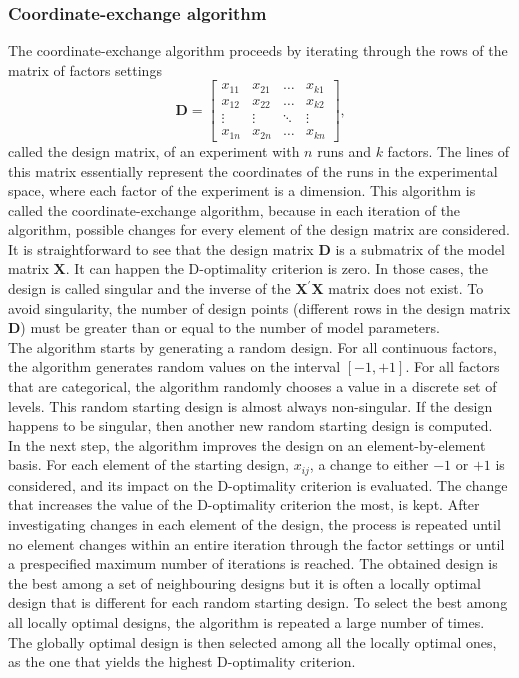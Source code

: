 \subsubsection{Coordinate-exchange algorithm}
The coordinate-exchange algorithm proceeds by iterating through the rows of the matrix of factors settings
\begin{equation}
\mathbf{D}= 
    \begin{bmatrix}
        x_{11} & x_{21} & \ldots & x_{k1} \\
        x_{12} & x_{22} & \ldots & x_{k2} \\
        \vdots & \vdots & \ddots & \vdots \\
        x_{1n} & x_{2n} & \ldots & x_{kn} 
    \end{bmatrix}
    \text{,}
    \label{mat:design_matrix}
\end{equation}
called the design matrix, of an experiment with $n$ runs and $k$ factors. The lines of this matrix essentially represent the 
coordinates of the runs in the experimental space, where each factor of the experiment is a dimension. This algorithm is called 
the coordinate-exchange algorithm, because in each iteration of the algorithm, possible changes for every element of the design 
matrix are considered. \\
It is straightforward to see that the design matrix $\mathbf{D}$ is a submatrix of the model matrix $\mathbf{X}$. It can happen 
the D-optimality criterion is zero. In those cases, the design is called singular and the inverse of the $\mathbf{X}^{\prime}
\mathbf{X}$ matrix does not exist. To avoid singularity, the number of design points (different rows in the design matrix $
\mathbf{D}$) must be greater than or equal to the number of model parameters.\\

The algorithm starts by generating a random design. For all continuous factors, the algorithm generates random values on the 
interval $[-1,+1]$. For all factors that are categorical, the algorithm randomly chooses a value in a discrete set of levels. 
This random starting design is almost always non-singular. If the design happens to be singular, then another new random 
starting design is computed.\\
In the next step, the algorithm improves the design on an element-by-element basis. For each element of the starting design, 
$x_{ij}$, a change to either $-1$ or $+1$ is considered, and its impact on the D-optimality criterion is evaluated. The change 
that increases the value of the D-optimality criterion the most, is kept. After investigating changes in each element of the 
design, the process is repeated until no element changes within an entire iteration through the factor settings or until a 
prespecified maximum number of iterations is reached. The obtained design is the best among a set of neighbouring designs but it 
is often a locally optimal design that is different for each random starting design. To select the best among all locally 
optimal designs, the algorithm is repeated a large number of times. The globally optimal design is then selected among all the 
locally optimal ones, as the one that yields the highest D-optimality criterion.

